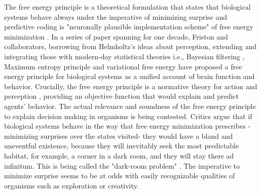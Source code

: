 \documentclass[11pt,twocolumn]{article}
\begin{document}
The free energy principle is a theoretical formulation that states that biological systems behave always under the imperative of minimizing surprise and predictive coding is "neuronally plausible implementation scheme" of free energy minimization \citep{schwartenbeck_exploration_2013}. In a series of paper spanning for one decade, Friston and collaborators, borrowing from Helmholtz’s ideas about perception, extending and integrating those with modern-day statistical theories i.e., Bayesian filtering \citep{friston_theory_2005}, Maximum entropy principle \citep{Jaynes:2003} and variational free energy \citep{Hinton-Camp:1993} have proposed a free energy principle for biological systems as a unified account of brain function and behavior.
Crucially, the free energy principle is a normative theory for action and perception \citep{schwartenbeck_exploration_2013}, providing an objective function that would explain and predict agents' behavior. 
The actual relevance and soundness of the free energy principle to explain decision making in organisms is being contested. Critics argue that if biological systems behave in the way that free energy minimization prescribes -minimizing surprises over the states visited- they would have a bland and uneventful existence, because they will inevitably seek the most predictable habitat, for example, a corner in a dark room, and they will stay there ad infinitum. This is being called the "dark-room problem" \citep{friston_free-energy_2012}. The imperative to minimize surprise seems to be at odds with easily recognizable qualities of organisms such as exploration or creativity.
\end{document}
